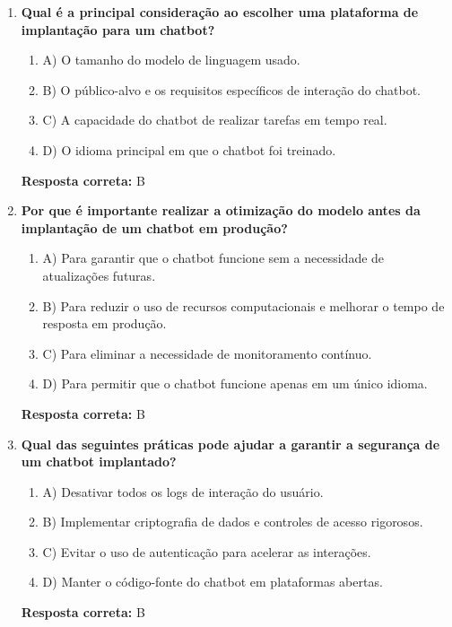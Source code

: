 \documentclass[14pt,a4paper,oneside]{book}
\begin{document}
\begin{enumerate}
	
	\item \textbf{Qual é a principal consideração ao escolher uma plataforma de implantação para um chatbot?}
	\begin{enumerate}[label=\alph*)]
		\item A) O tamanho do modelo de linguagem usado.
		\item B) O público-alvo e os requisitos específicos de interação do chatbot.
		\item C) A capacidade do chatbot de realizar tarefas em tempo real.
		\item D) O idioma principal em que o chatbot foi treinado.
	\end{enumerate}
	\vspace{5mm}
	\textbf{Resposta correta:} B
	
	\item \textbf{Por que é importante realizar a otimização do modelo antes da implantação de um chatbot em produção?}
	\begin{enumerate}[label=\alph*)]
		\item A) Para garantir que o chatbot funcione sem a necessidade de atualizações futuras.
		\item B) Para reduzir o uso de recursos computacionais e melhorar o tempo de resposta em produção.
		\item C) Para eliminar a necessidade de monitoramento contínuo.
		\item D) Para permitir que o chatbot funcione apenas em um único idioma.
	\end{enumerate}
	\vspace{5mm}
	\textbf{Resposta correta:} B
	
	\item \textbf{Qual das seguintes práticas pode ajudar a garantir a segurança de um chatbot implantado?}
	\begin{enumerate}[label=\alph*)]
		\item A) Desativar todos os logs de interação do usuário.
		\item B) Implementar criptografia de dados e controles de acesso rigorosos.
		\item C) Evitar o uso de autenticação para acelerar as interações.
		\item D) Manter o código-fonte do chatbot em plataformas abertas.
	\end{enumerate}
	\vspace{5mm}
	\textbf{Resposta correta:} B
	

\end{enumerate}
\end{document}

